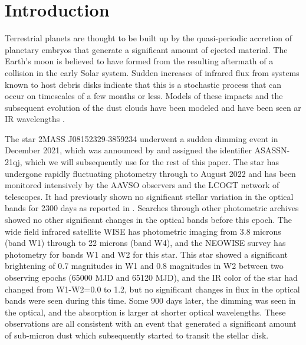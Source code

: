 \documentclass{aa}
\newcommand{\asas}{ASASSN-21qj}
\begin{document}

   \maketitle
%

   \section{Introduction}

Terrestrial planets are thought to be built up by the quasi-periodic accretion of planetary embryos that generate a significant amount of ejected material.
%
The Earth's moon is believed to have formed from the resulting aftermath of a collision in the early Solar system.
%
Sudden increases of infrared flux from systems known to host debris disks indicate that this is a stochastic process that can occur on timescales of a few months or less.
%
Models of these impacts and the subsequent evolution of the dust clouds have been modeled \citep{Jackson12,Jackson14} and have been seen ar IR wavelengths \citep{Su19,Su22}.

The star 2MASS J08152329-3859234 underwent a sudden dimming event in December 2021, which was announced by \citet{RizzoSmith21} and assigned the identifier \asas, which we will subsequently use for the rest of this paper.
%
The star has undergone rapidly fluctuating photometry through to August 2022 \citep{RizzoSmith22} and has been monitored intensively by the AAVSO observers and the LCOGT network of telescopes.
%
It had previously shown no significant stellar variation in the optical bands for 2300 days as reported in \citet{RizzoSmith21}.
%
Searches through other photometric archives showed no other significant changes in the optical bands before this epoch.
%
The wide field infrared satellite WISE has photometric imaging from 3.8 microns (band W1) through to 22 microns (band W4), and the NEOWISE survey has photometry for bands W1 and W2 for this star.
%
This star showed a significant brightening of 0.7 magnitudes in W1 and 0.8 magnitudes in W2 between two observing epochs (65000 MJD and 65120 MJD), and the IR color of the star had changed from W1-W2=0.0 to 1.2, but no significant changes in flux in the optical bands were seen during this time.
%
Some 900 days later, the dimming was seen in the optical, and the absorption is larger at shorter optical wavelengths.
%
These observations are all consistent with an event that generated a significant amount of sub-micron dust which subsequently started to transit the stellar disk.
\end{document}
